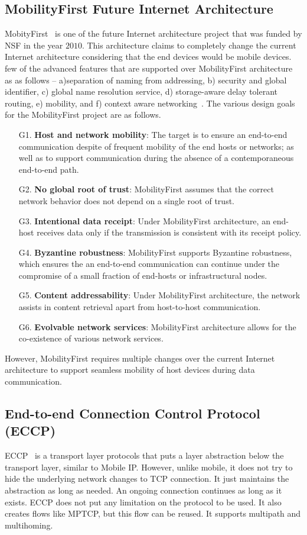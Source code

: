\subsection{MobilityFirst Future Internet Architecture}
MobityFirst~\cite{MobilityFirst,raychaudhuri2012mobilityfirst,venkataramani2014mobilityfirst} is one of the future Internet architecture project that was funded by NSF in the year $2010$. This architecture claims to completely change the current Internet architecture considering that the end devices would be mobile devices.  few of the advanced features that are supported over MobilityFirst architecture as as follows -- a)separation of naming from addressing, b) security and global identifier, c) global name resolution service, d) storage-aware delay tolerant routing, e) mobility, and f) context aware networking~\cite{MobilityFirstContextAwareDemo}. The various design goals for the MobilityFirst project are as follows.
\begin{enumerate}
	\item[G1.] \textbf{Host and network mobility}: The target is to ensure an end-to-end communication despite of frequent mobility of the end hosts or networks; as well as to support communication during the absence of a contemporaneous end-to-end path.
	\item[G2.] \textbf{No global root of trust}: MobilityFirst assumes that the correct network behavior does not depend on a single root of trust. 
	\item[G3.] \textbf{Intentional data receipt}: Under MobilityFirst architecture, an end-host receives data only if the transmission is consistent with its receipt policy.
	\item[G4.] \textbf{Byzantine robustness}: MobilityFirst supports Byzantine robustness, which ensures the an end-to-end communication can continue under the compromise of a small fraction of end-hosts or infrastructural nodes.
	\item[G5.] \textbf{Content addressability}: Under MobilityFirst architecture, the network assists in content retrieval apart from host-to-host communication.
	\item[G6.] \textbf{Evolvable network services}: MobilityFirst architecture allows for the co-existence of various network services.
\end{enumerate}
However, MobilityFirst requires multiple changes over the current Internet architecture to support seamless mobility of host devices during data communication. 

\subsection{End-to-end Connection Control Protocol (ECCP)}
ECCP~\cite{ECCP} is a transport layer protocols that puts a layer abstraction below the transport layer, similar to Mobile IP. However, unlike mobile, it does not try to hide the underlying network changes to TCP connection. It just maintains the abstraction as long as needed. An ongoing connection continues as long as it exists. ECCP does not put any limitation on the protocol to be used. It also creates flows like MPTCP, but this flow can be reused. It supports multipath and multihoming. 

